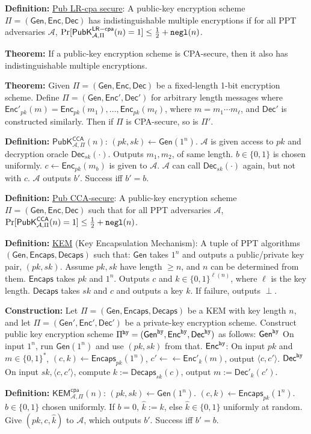 \documentclass[10pt]{article}
\newcommand{\AAA}{\mathcal{A}}
\newcommand{\defn}[1]{{\bf Definition:} \underline{#1}}
\newcommand{\thm}[1]{{\bf Theorem:} \underline{#1}}
\newcommand{\con}[1]{{\bf Construction:} \underline{#1}}
\newcommand{\Enc}{\mathsf{Enc}}
\newcommand{\Dec}{\mathsf{Dec}}
\newcommand{\Encaps}{\mathsf{Encaps}}
\newcommand{\Decaps}{\mathsf{Decaps}}
\newcommand{\Gen}{\mathsf{Gen}}
\newcommand{\ang}[1]{\langle#1\rangle}
\newcommand{\GenEncDec}{(\Gen,\Enc,\Dec)}
\newcommand{\GenEncapsDecaps}{(\Gen,\Encaps,\Decaps)}
\newcommand{\ExptPubCcaArgs}[2]{\mathsf{PubK}^{\mathsf{CCA}}_{#1,#2}}
\newcommand{\ExptPubCpaArgs}[2]{\mathsf{PubK}^{\mathsf{LR-cpa}}_{#1,#2}}
\newcommand{\ExptKemCpa}{\mathsf{KEM}^{\mathsf{cpa}}_{\AAA,\Pi}}
\newcommand{\ExptPubCca}{\ExptPubCcaArgs{\AAA}{\Pi}}
\newcommand{\ExptPubCpa}{\ExptPubCpaArgs{\AAA}{\Pi}}
\newcommand{\negl}{{\tt negl}}
\newcommand{\hy}{{\tt hy}}
\newcommand{\from}{\leftarrow}
\begin{document}
\begin{multicols}{4}
\defn{Pub LR-cpa secure}: A public-key encryption scheme $\Pi=\GenEncDec$ has indistinguishable multiple encryptions if for all PPT adversaries $\AAA$, $\Pr[\ExptPubCpa(n)=1]\leq\frac{1}{2}+\negl(n)$.

\thm{}If a public-key encryption scheme is CPA-secure, then it also has indistinguishable multiple encryptions.

\thm{}Given $\Pi=\GenEncDec$ be a fixed-length 1-bit encryption scheme. Define $\Pi=(\Gen,\Enc',\Dec')$ for arbitrary length messages where $\Enc'_{pk}(m)=\Enc_{pk}(m_1),\dots,\Enc_{pk}(m_\ell)$, where $m=m_1\cdots m_\ell$, and $\Dec'$ is constructed similarly. Then if $\Pi$ is CPA-secure, so is $\Pi'$.

\defn{$\ExptPubCca(n)$}: $(pk,sk)\from\Gen(1^n)$. $\AAA$ is given access to $pk$ and decryption oracle $\Dec_{sk}(\cdot)$. Outputs $m_1,m_2$, of same length. $b\in\{0,1\}$ is chosen uniformly. $c\from\Enc_{pk}(m_b)$ is given to $\AAA$. $\AAA$ can call $\Dec_{sk}(\cdot)$ again, but not with $c$. $\AAA$ outputs $b'$. Success iff $b'=b$.

\defn{Pub CCA-secure}: A public-key encryption scheme $\Pi=\GenEncDec$ such that for all PPT adversaries $\AAA$, $\Pr[\ExptPubCca(n)=1]\leq\frac{1}{2}+\negl(n)$.

\defn{KEM} (Key Encapsulation Mechanism): A tuple of PPT algorithms $\GenEncapsDecaps$ such that: $\Gen$ takes $1^n$ and outputs a public/private key pair, $(pk,sk)$. Assume $pk,sk$ have length $\geq n$, and $n$ can be determined from them. $\Encaps$ takes $pk$ and $1^n$. Outputs $c$ and $k\in\{0,1\}^{\ell(n)}$, where $\ell$ is the key length. $\Decaps$ takes $sk$ and $c$ and outputs a key $k$. If failure, outputs $\perp$.

\con{}Let $\Pi=\GenEncapsDecaps$ be a KEM with key length $n$, and let $\Pi=(\Gen',\Enc',\Dec')$ be a private-key encryption scheme. Construct public key encryption scheme $\Pi^{\hy}=(\Gen^\hy,\Enc^\hy,\Dec^\hy)$ as follows: $\Gen^\hy$ On input $1^n$, run $\Gen(1^n)$ and use $(pk,sk)$ from that. $\Enc^\hy$: On input $pk$ and $m\in\{0,1\}^*$, $(c,k)\from\Encaps_{pk}(1^n)$, $c'\from\from\Enc'_k(m)$, output $\ang{c,c'}$. $\Dec^\hy$ On input $sk,\ang{c,c'}$, compute $k:=\Decaps_{sk}(c)$, output $m:=\Dec'_k(c')$.

\defn{$\ExptKemCpa(n)$}: $(pk,sk)\from\Gen(1^n)$. $(c,k)\from\Encaps_{pk}(1^n)$. $b\in\{0,1\}$ chosen uniformly. If $b=0$, $\hat{k}:=k$, else $\hat{k}\in\{0,1\}$ uniformly at random. Give $(pk,c,\hat{k})$ to $\AAA$, which outputs $b'$. Success iff $b'=b$.


\end{multicols}
\end{document}
